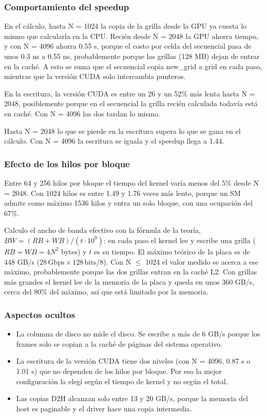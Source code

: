 \subsubsection*{Comportamiento del speedup}

En el cálculo, hasta N = 1024 la copia de la grilla desde la GPU ya cuesta lo mismo que calcularla en la CPU. Recién desde N = 2048 la GPU ahorra tiempo, y con N = 4096 ahorra 0.55 s, porque el costo por celda del secuencial pasa de unos 0.3 ns a 0.55 ns, probablemente porque las grillas (128 MB) dejan de entrar en la caché. A esto se suma que el secuencial copia new\_grid a grid en cada paso, mientras que la versión CUDA solo intercambia punteros.

En la escritura, la versión CUDA es entre un 26 y un 52\% más lenta hasta N = 2048, posiblemente porque en el secuencial la grilla recién calculada todavía está en caché. Con N = 4096 las dos tardan lo mismo.

Hasta N = 2048 lo que se pierde en la escritura supera lo que se gana en el cálculo. Con N = 4096 la escritura se iguala y el speedup llega a 1.44.

\subsubsection*{Efecto de los hilos por bloque}

Entre 64 y 256 hilos por bloque el tiempo del kernel varía menos del 5\% desde N = 2048. Con 1024 hilos es entre 1.49 y 1.76 veces más lento, porque un SM admite como máximo 1536 hilos y entra un solo bloque, con una ocupación del 67\%.

Calculo el ancho de banda efectivo con la fórmula de la teoría, $BW = (RB + WB) / (t \cdot 10^9)$: en cada paso el kernel lee y escribe una grilla ($RB = WB = 4N^2$ bytes) y $t$ es su tiempo. El máximo teórico de la placa es de 448 GB/s ($28\,\text{Gbps} \times 128\,\text{bits} / 8$). Con N $\leq$ 1024 el valor medido se acerca a ese máximo, probablemente porque las dos grillas entran en la caché L2. Con grillas más grandes el kernel lee de la memoria de la placa y queda en unos 360 GB/s, cerca del 80\% del máximo, así que está limitado por la memoria.

\subsubsection*{Aspectos ocultos}

\begin{itemize}
  \item La columna de disco no mide el disco. Se escribe a más de 6 GB/s porque los frames solo se copian a la caché de páginas del sistema operativo.
  \item La escritura de la versión CUDA tiene dos niveles (con N = 4096, 0.87 s o 1.01 s) que no dependen de los hilos por bloque. Por eso la mejor configuración la elegí según el tiempo de kernel y no según el total.
  \item Las copias D2H alcanzan solo entre 13 y 20 GB/s, porque la memoria del host es paginable y el driver hace una copia intermedia.
\end{itemize}

